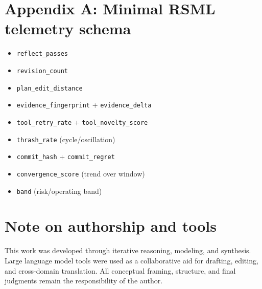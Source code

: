 \documentclass[11pt]{article}
\begin{document}
\section*{Appendix A: Minimal RSML telemetry schema}
\begin{itemize}
  \item \texttt{reflect\_passes}
  \item \texttt{revision\_count}
  \item \texttt{plan\_edit\_distance}
  \item \texttt{evidence\_fingerprint} + \texttt{evidence\_delta}
  \item \texttt{tool\_retry\_rate} + \texttt{tool\_novelty\_score}
  \item \texttt{thrash\_rate} (cycle/oscillation)
  \item \texttt{commit\_hash} + \texttt{commit\_regret}
  \item \texttt{convergence\_score} (trend over window)
  \item \texttt{band} (risk/operating band)
\end{itemize}

\section*{Note on authorship and tools}
This work was developed through iterative reasoning, modeling, and synthesis. Large language model tools
were used as a collaborative aid for drafting, editing, and cross-domain translation. All conceptual framing,
structure, and final judgments remain the responsibility of the author.
\end{document}
